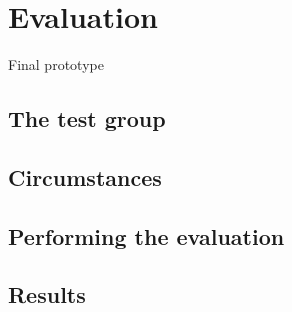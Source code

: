 \chapter{Evaluation}
\label{ch:evaluation}

Final prototype

\section{The test group}

\section{Circumstances}

\section{Performing the evaluation}

\section{Results}

